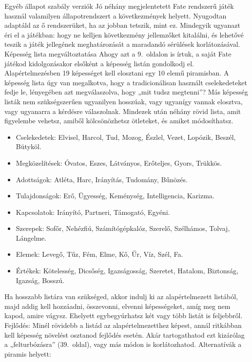 \documentclass[oneside]{book}
\newcommand{\page}[1]{#1.~oldal}
\newcommand{\onpage}[1]{#1.~oldalon}
\begin{document}
Egyéb állapot szabály verziók
Jó néhány megjelentetett Fate rendszerű játék használ valamilyen állapotrendszert a következmények helyett. Nyugodtan adaptáld az ő rendszerüket, ha az jobban tetszik, mint ez. Mindegyik ugyanazt éri el a játékban: hogy ne kelljen következmény jellemzőket kitalálni, és lehetővé teszik a játék jellegének meghatározását a maradandó sérülések korlátozásával.
Képesség lista megváltoztatása
Ahogy azt a \onpage{9} is írtuk, a saját Fate játékod kidolgozásakor elsőként a képesség listán gondolkodj el. Alapértelmezésben 19 képességet kell elosztani egy 10 elemű piramisban. A képesség lista úgy van megalkotva, hogy a tradicionálisan használt cselekedeteket fedje le, lényegében azt megválaszolva, hogy „mit tudsz megtenni”? Más képesség listák nem szükségszerűen ugyanilyen hosszúak, vagy ugyanígy vannak elosztva, vagy ugyanarra a kérdésre válaszolnak. Mindezek után néhány rövid lista, amit figyelembe vehetsz, amiből kölcsönözhetsz ötleteket, és amiket módosíthatsz.

\begin{itemize}
    \item Cselekedetek: Elvisel, Harcol, Tud, Mozog, Észlel, Vezet, Lopózik, Beszél, Bütyköl.
    \item Megközelítések: Óvatos, Eszes, Látványos, Erőteljes, Gyors, Trükkös.
    \item Adottságok: Atléta, Harc, Irányítás, Tudomány, Bűnözés.
    \item Tulajdonságok: Erő, Ügyesség, Keménység, Intelligencia, Karizma.
    \item Kapcsolatok: Irányító, Partneri, Támogató, Egyéni.
    \item Szerepek: Sofőr, Nehézfiú, Számítógépkalóz, Szerelő, Szélhámos, Tolvaj, Lángelme.
    \item Elemek: Levegő, Tűz, Fém, Elme, Kő, Űr, Víz, Szél, Fa.
    \item Értékek: Kötelesség, Dicsőség, Igazságosság, Szeretet, Hatalom, Biztonság, Igazság, Bosszú.
\end{itemize}

Ha hosszabb listára van szükséged, akkor indulj ki az alapértelmezett listából, majd addig kell hozzáadni, összevonni, elvenni képességeket, amíg meg nem kapod, amire vágysz. Ehelyett egybegyúrhatsz két vagy több listát is feljebbről.
Fejlődés: Minél rövidebb a listád az alapértelmezetthez képest, annál ritkábban kell képesség növelést osztanod fejlődés esetén. Akár tartogathatod ezt kizárólag a „felturbózásra” (\page{39}), vagy más módon is korlátozhatod.
Alternatívák a piramis helyett:
\end{document}
